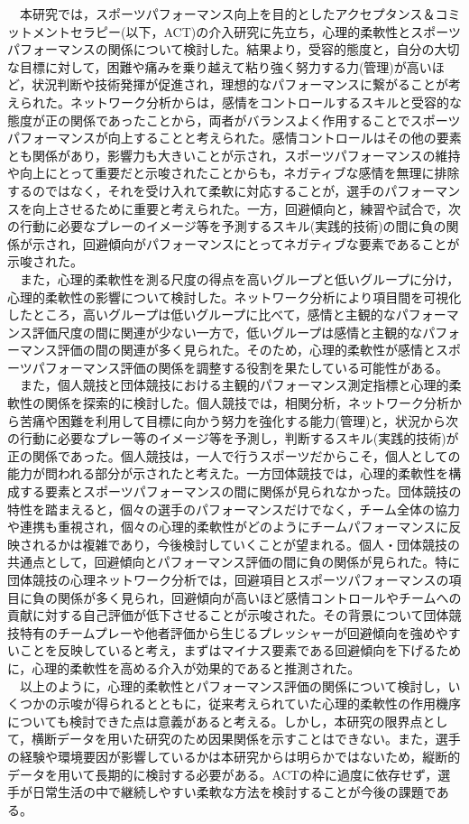 \documentclass[12pt,a4paper,xelatex,ja=standard]{bxjsarticle}
\begin{document}
　本研究では，スポーツパフォーマンス向上を目的としたアクセプタンス＆コミットメントセラピー(以下，ACT)の介入研究に先立ち，心理的柔軟性とスポーツパフォーマンスの関係について検討した。結果より，受容的態度と，自分の大切な目標に対して，困難や痛みを乗り越えて粘り強く努力する力(管理)が高いほど，状況判断や技術発揮が促進され，理想的なパフォーマンスに繋がることが考えられた。ネットワーク分析からは，感情をコントロールするスキルと受容的な態度が正の関係であったことから，両者がバランスよく作用することでスポーツパフォーマンスが向上することと考えられた。感情コントロールはその他の要素とも関係があり，影響力も大きいことが示され，スポーツパフォーマンスの維持や向上にとって重要だと示唆されたことからも，ネガティブな感情を無理に排除するのではなく，それを受け入れて柔軟に対応することが，選手のパフォーマンスを向上させるために重要と考えられた。一方，回避傾向と，練習や試合で，次の行動に必要なプレーのイメージ等を予測するスキル(実践的技術)の間に負の関係が示され，回避傾向がパフォーマンスにとってネガティブな要素であることが示唆された。\\
　また，心理的柔軟性を測る尺度の得点を高いグループと低いグループに分け，心理的柔軟性の影響について検討した。ネットワーク分析により項目間を可視化したところ，高いグループは低いグループに比べて，感情と主観的なパフォーマンス評価尺度の間に関連が少ない一方で，低いグループは感情と主観的なパフォーマンス評価の間の関連が多く見られた。そのため，心理的柔軟性が感情とスポーツパフォーマンス評価の関係を調整する役割を果たしている可能性がある。\\
　また，個人競技と団体競技における主観的パフォーマンス測定指標と心理的柔軟性の関係を探索的に検討した。個人競技では，相関分析，ネットワーク分析から苦痛や困難を利用して目標に向かう努力を強化する能力(管理)と，状況から次の行動に必要なプレー等のイメージ等を予測し，判断するスキル(実践的技術)が正の関係であった。個人競技は，一人で行うスポーツだからこそ，個人としての能力が問われる部分が示されたと考えた。一方団体競技では，心理的柔軟性を構成する要素とスポーツパフォーマンスの間に関係が見られなかった。団体競技の特性を踏まえると，個々の選手のパフォーマンスだけでなく，チーム全体の協力や連携も重視され，個々の心理的柔軟性がどのようにチームパフォーマンスに反映されるかは複雑であり，今後検討していくことが望まれる。個人・団体競技の共通点として，回避傾向とパフォーマンス評価の間に負の関係が見られた。特に団体競技の心理ネットワーク分析では，回避項目とスポーツパフォーマンスの項目に負の関係が多く見られ，回避傾向が高いほど感情コントロールやチームへの貢献に対する自己評価が低下させることが示唆された。その背景について団体競技特有のチームプレーや他者評価から生じるプレッシャーが回避傾向を強めやすいことを反映していると考え，まずはマイナス要素である回避傾向を下げるために，心理的柔軟性を高める介入が効果的であると推測された。\\
　以上のように，心理的柔軟性とパフォーマンス評価の関係について検討し，いくつかの示唆が得られるとともに，従来考えられていた心理的柔軟性の作用機序についても検討できた点は意義があると考える。しかし，本研究の限界点として，横断データを用いた研究のため因果関係を示すことはできない。また，選手の経験や環境要因が影響しているかは本研究からは明らかではないため，縦断的データを用いて長期的に検討する必要がある。ACTの枠に過度に依存せず，選手が日常生活の中で継続しやすい柔軟な方法を検討することが今後の課題である。
\end{document}
